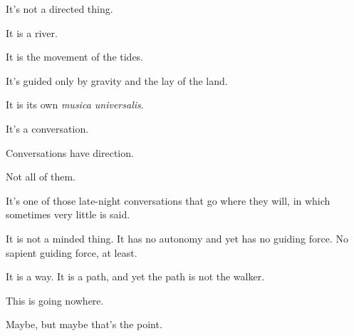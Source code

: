 It's not a directed thing.

It is a river.

It is the movement of the tides.

It's guided only by gravity and the lay of the land.

It is its own \emph{musica universalis}.

It's a conversation.

\begin{ally}
Conversations have direction.
\end{ally}
Not all of them.

It's one of those late-night conversations that go where they will, in which sometimes very little is said.

It is not a minded thing. It has no autonomy and yet has no guiding force. No sapient guiding force, at least.

It is a way. It is a path, and yet the path is not the walker.

\begin{ally}
This is going nowhere.
\end{ally}
Maybe, but maybe that's the point.
\newpage
